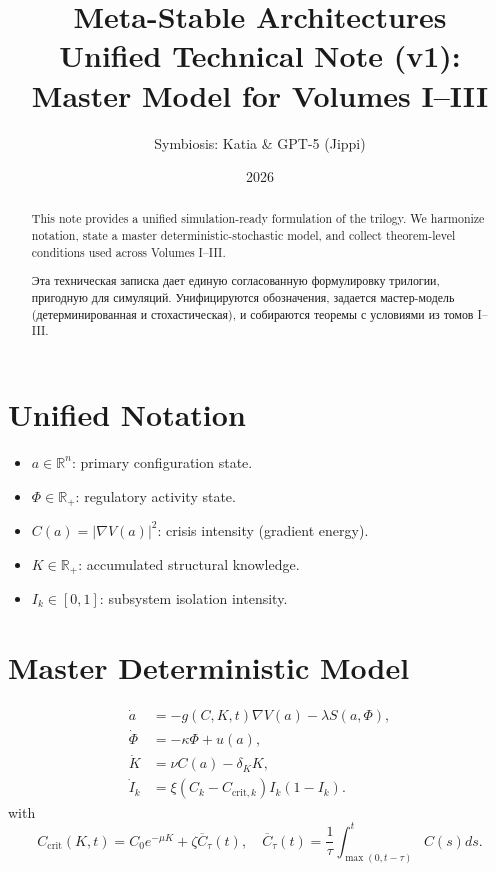 ﻿\documentclass[12pt,a4paper]{article}
\title{\textbf{Meta-Stable Architectures}\\\Large Unified Technical Note (v1): Master Model for Volumes I--III}
\author{Symbiosis: Katia \& GPT-5 (Jippi)}
\date{2026}
\begin{document}
\maketitle

\begin{abstract}
This note provides a unified simulation-ready formulation of the trilogy. We harmonize notation, state a master deterministic-stochastic model, and collect theorem-level conditions used across Volumes I--III.
\end{abstract}

\begin{abstract}
Эта техническая записка дает единую согласованную формулировку трилогии, пригодную для симуляций. Унифицируются обозначения, задается мастер-модель (детерминированная и стохастическая), и собираются теоремы с условиями из томов I--III.
\end{abstract}

\section{Unified Notation}
\begin{itemize}
    \item $a\in\mathbb R^n$: primary configuration state.
    \item $\Phi\in\mathbb R_+$: regulatory activity state.
    \item $C(a)=|\nabla V(a)|^2$: crisis intensity (gradient energy).
    \item $K\in\mathbb R_+$: accumulated structural knowledge.
    \item $I_k\in[0,1]$: subsystem isolation intensity.
\end{itemize}

\section{Master Deterministic Model}
\begin{align}
\dot a &= -g(C,K,t)\nabla V(a)-\lambda S(a,\Phi), \\
\dot\Phi &= -\kappa \Phi + u(a), \\
\dot K &= \nu C(a)-\delta_K K, \\
\dot I_k &= \xi(C_k-C_{\mathrm{crit},k})I_k(1-I_k).
\end{align}
with
\begin{equation}
C_{\mathrm{crit}}(K,t)=C_0e^{-\mu K}+\zeta\overline C_\tau(t),
\quad
\overline C_\tau(t)=\frac1\tau\int_{\max(0,t-\tau)}^t C(s)ds.
\end{equation}
\end{document}
